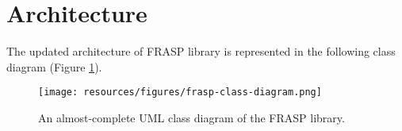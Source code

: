 
\section{Architecture}
\label{section:implementation:architecture}

The updated architecture of FRASP library is represented in the following class
diagram (Figure \ref{figure:frasp-class-diagram}).

\begin{figure}[!ht]
  \centering
  \texttt{[image: resources/figures/frasp-class-diagram.png]}
  \caption{An almost-complete UML class diagram of the FRASP library.}
  \label{figure:frasp-class-diagram}
\end{figure}